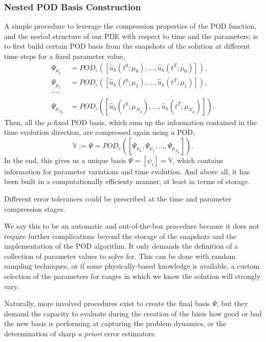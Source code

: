 \documentclass[../../1_heat_equation.tex]{subfiles}
\newcommand{\rbV}{\ensuremath{\mathbb{V}}}
\begin{document}
\subsubsection{Nested POD Basis Construction}
\label{sec:1d_rom_heat_equation_basis_construction_nested}
A simple procedure to leverage the compression properties of the POD function, and the nested structure of our PDE with respect to time and the parameters; is to first build certain POD basis from the snapshots of the solution at different time steps for a fixed parameter value,
\begin{align*}
    \Psi_{\mu_0} &= POD_{\varepsilon}\left(\left[\hat{u}_h(t^0; \mu_0), \ldots, \hat{u}_h(t^T; \mu_0)\right]\right), \\
    \Psi_{\mu_1} &= POD_{\varepsilon}\left(\left[\hat{u}_h(t^0; \mu_1), \ldots, \hat{u}_h(t^T; \mu_1)\right]\right), \\  
    \ldots, \\
    \Psi_{\mu_{N_{\mu}}} &= POD_{\varepsilon}\left(\left[\hat{u}_h(t^0; \mu_{N_{\mu}}), \ldots, \hat{u}_h(t^T; \mu_{N_{\mu}})\right]\right).
\end{align*}
Then, all the $\mu$-fixed POD basis, which sum up the information contained in the time evolution direction, are compressed again using a POD,
\begin{equation*}
    \rbV := \Psi = POD_{\varepsilon} \left(\left[\Psi_{\mu_0}, \Psi_{\mu_1}, \ldots, \Psi_{\mu_{N_{\mu}}}\right]\right).
\end{equation*}
In the end, this gives us a unique basis $\Psi = [\psi_i] = \rbV$, which contains information for parameter variations and time evolution.
And above all, it has been built in a computationally efficienty manner, at least in terms of storage.

Different error tolerances could be prescribed at the time and parameter compression stages.

We say this to be an automatic and out-of-the-box procedure because it does not require further complications beyond the storage of the snapshots and the implementation of the POD algorithm.
It only demands the definition of a collection of parameter values to solve for.
This can be done with random sampling techniques, or if some physically-based knowledge is available, a custom selection of the parameters for ranges in which we know the solution will strongly vary.

Naturally, more involved procedures exist to create the final basis $\Psi$, but they demand the capacity to evaluate during the creation of the basis how good or bad the new basis is performing at capturing the problem dynamics, or the determination of sharp \emph{a priori} error estimators.
\end{document}
